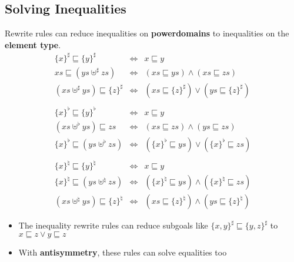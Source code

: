 \documentclass[portrait]{sciposter}
\begin{document}
\begin{multicols}{3}
\subsection*{Solving Inequalities}
Rewrite rules can reduce inequalities on \textbf{powerdomains} to inequalities on the \textbf{element type}.
\begin{displaymath}
\begin{array}{rcl}
\{x\}^{\sharp}\sqsubseteq\{y\}^{\sharp} & \iff & x\sqsubseteq y \\
xs\sqsubseteq(ys\uplus^{\sharp}zs) & \iff & (xs\sqsubseteq ys)\wedge(xs\sqsubseteq zs) \\
(xs\uplus^{\sharp}ys)\sqsubseteq\{z\}^{\sharp} & \iff & (xs\sqsubseteq\{z\}^{\sharp})\vee(ys\sqsubseteq\{z\}^{\sharp})\\
\\
\{x\}^{\flat}\sqsubseteq\{y\}^{\flat} & \iff & x\sqsubseteq y \\
(xs\uplus^{\flat}ys)\sqsubseteq zs & \iff & (xs\sqsubseteq zs)\wedge(ys\sqsubseteq zs) \\
\{x\}^{\flat}\sqsubseteq(ys\uplus^{\flat}zs) & \iff & (\{x\}^{\flat}\sqsubseteq ys)\vee(\{x\}^{\flat}\sqsubseteq zs)\\
\\
\{x\}^{\natural}\sqsubseteq\{y\}^{\natural} & \iff & x\sqsubseteq y \\
\{x\}^{\natural}\sqsubseteq(ys\uplus^{\natural}zs) & \iff & (\{x\}^{\natural}\sqsubseteq ys)\wedge(\{x\}^{\natural}\sqsubseteq zs) \\
(xs\uplus^{\natural}ys)\sqsubseteq\{z\}^{\natural} & \iff & (xs\sqsubseteq\{z\}^{\natural})\wedge(ys\sqsubseteq\{z\}^{\natural})
\end{array}
\end{displaymath}

\begin{itemize}
\item The inequality rewrite rules can reduce subgoals like $\{x,y\}^\sharp\sqsubseteq\{y,z\}^\sharp$ to $x \sqsubseteq z \vee y \sqsubseteq z$
\item With \textbf{antisymmetry}, these rules can solve equalities too
\end{itemize}

\end{multicols}


\end{document}
